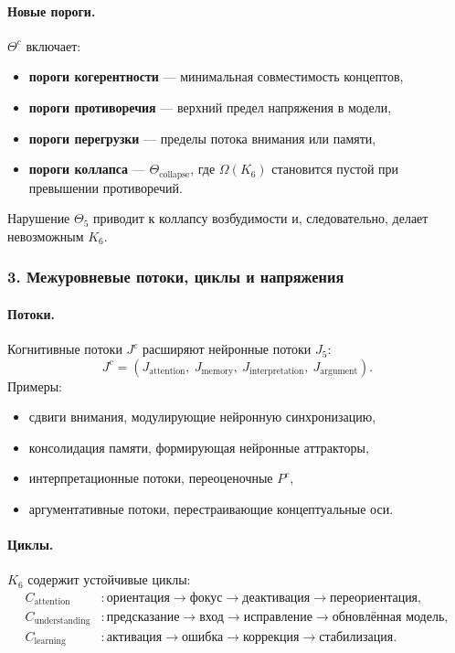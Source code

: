 \paragraph{Новые пороги.}
$\Theta^{c}$ включает:
\begin{itemize}
  \item \textbf{пороги когерентности} — минимальная совместимость концептов,
  \item \textbf{пороги противоречия} — верхний предел напряжения в модели,
  \item \textbf{пороги перегрузки} — пределы потока внимания или памяти,
  \item \textbf{пороги коллапса} — $\Theta_{\mathrm{collapse}}$, где
        $\Omega(K_6)$ становится пустой при превышении противоречий.
\end{itemize}

Нарушение $\Theta_5$ приводит к коллапсу возбудимости и, следовательно,
делает невозможным $K_6$.

\subsubsection{3. Межуровневые потоки, циклы и напряжения}

\paragraph{Потоки.}
Когнитивные потоки $J^{c}$ расширяют нейронные потоки $J_5$:
\[
J^{c} = (J_{\mathrm{attention}},\ J_{\mathrm{memory}},\
        J_{\mathrm{interpretation}},\ J_{\mathrm{argument}}).
\]
Примеры:
\begin{itemize}
  \item сдвиги внимания, модулирующие нейронную синхронизацию,
  \item консолидация памяти, формирующая нейронные аттракторы,
  \item интерпретационные потоки, переоценочные $P^{c}$,
  \item аргументативные потоки, перестраивающие концептуальные оси.
\end{itemize}

\paragraph{Циклы.}
$K_6$ содержит устойчивые циклы:
\begin{align*}
C_{\mathrm{attention}} &: \text{ориентация} \rightarrow \text{фокус}
    \rightarrow \text{деактивация} \rightarrow \text{переориентация},\\[4pt]
C_{\mathrm{understanding}} &: \text{предсказание} \rightarrow \text{вход}
    \rightarrow \text{исправление} \rightarrow \text{обновлённая модель},\\[4pt]
C_{\mathrm{learning}} &: \text{активация} \rightarrow \text{ошибка}
    \rightarrow \text{коррекция} \rightarrow \text{стабилизация}.
\end{align*}

